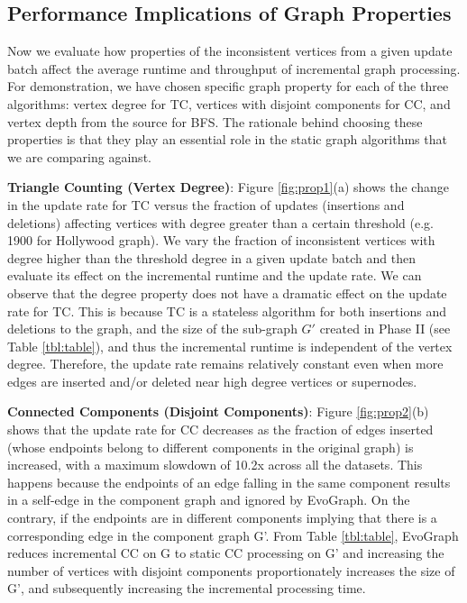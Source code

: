 \subsection{Performance Implications of Graph Properties}

Now we evaluate how properties of the inconsistent vertices from a given update batch affect the average runtime and throughput of incremental graph processing. For demonstration, we have chosen specific graph property for each of the three algorithms: vertex degree for TC, vertices with disjoint components for CC,  and vertex depth from the source for BFS. The rationale behind choosing these properties is that they play an essential role in the static graph algorithms that we are comparing against.  

\textbf{Triangle Counting (Vertex Degree)}:  Figure \ref{fig:prop1}(a) shows the change in the update rate for TC versus the fraction of updates (insertions and deletions) affecting vertices with degree greater than a certain threshold (e.g. 1900 for Hollywood graph). We vary the fraction of inconsistent vertices with degree higher than the threshold degree in a given update batch and then evaluate its effect on the incremental runtime and the update rate. We can observe that the degree property does not have a dramatic effect on the update rate for TC. This is because TC is a stateless algorithm for both insertions and deletions to the graph, and the size of the sub-graph $G'$ created in Phase II (see Table \ref{tbl:table}), and thus the incremental runtime is independent of the vertex degree. Therefore, the update rate remains relatively constant even when more edges are inserted and/or deleted near high degree vertices or supernodes. 

\textbf{Connected Components (Disjoint Components)}: Figure \ref{fig:prop2}(b) shows that the update rate for CC decreases as the fraction of edges inserted (whose endpoints belong to different components in the original graph) is increased, with a maximum slowdown of 10.2x across all the datasets. This happens because the endpoints of an edge falling in the same component results in a self-edge in the component graph and ignored by EvoGraph. On the contrary, if the endpoints are in different components implying that there is a corresponding edge in the component graph G'. From Table \ref{tbl:table}, EvoGraph reduces incremental CC on G to static CC processing on G' and increasing the number of vertices with disjoint components proportionately increases the size of G', and subsequently increasing the incremental processing time.

